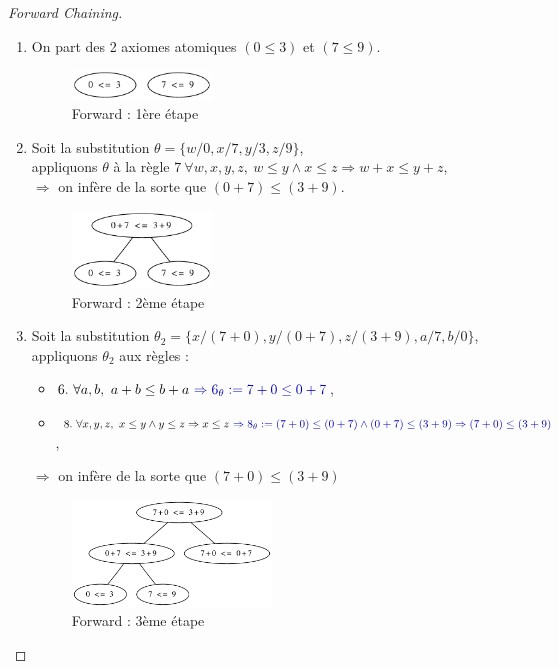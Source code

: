 \documentclass{article}
\newcommand{\blu}[1]{\textcolor{darkblue}{#1}}
\newtheorem{proof}{Preuve}
\begin{document}
\begin{sffamily}
\begin{enumerate}
\begin{proof}[Forward Chaining]$ $\\
\begin{enumerate}[1.]
\item On part des 2 axiomes atomiques $(0\leq 3)$ et $(7\leq 9)$.
\begin{figure}[h!]
    \begin{center}
    \includegraphics[width=0.35\textwidth]{forward1.pdf}
    \caption{Forward : 1ère étape}
    \end{center}	
\end{figure}

\item Soit la substitution $\theta = \{w/0,x/7,y/3,z/9\}$,\\
appliquons $\theta$ à la règle $7\ \forall w, x, y, z,\ w \leq y \wedge x \leq z \Rightarrow w + x \leq y + z$, \\
$\Rightarrow$ on infère de la sorte que $\boxed{(0+7)\leq (3+9)}$.
\begin{figure}[h!]
    \begin{center}
    \includegraphics[width=0.35\textwidth]{forward2.pdf}
    \caption{Forward : 2ème étape}
    \end{center}	
\end{figure}
\newpage
\item Soit la substitution $\theta_2 = \{x/(7+0), y/(0+7), z/(3+9), a/7, b/0\}$,\\
appliquons $\theta_2$ aux règles :
\begin{itemize}
\item $6.\ \forall a, b,\ a + b \leq b + a\ \blu{\Rightarrow 6_\theta := 7+0\leq 0+7}$,
\item $8.\ \forall x, y, z,\ x \leq y \wedge y \leq z \Rightarrow x \leq z\ \blu{\Rightarrow 8_\theta := (7+0) \leq (0+7) \wedge 
(0+7) \leq (3+9) \Rightarrow (7+0) \leq (3+9)}$,
\end{itemize}
$\Rightarrow$ on infère de la sorte que $\boxed{(7+0)\leq (3+9)}$ 
\begin{figure}[h!]
    \begin{center}
    \includegraphics[width=0.5\textwidth]{forward3.pdf}
    \caption{Forward : 3ème étape}
    \end{center}	
\end{figure}


\end{enumerate}
\end{proof}
\end{enumerate}
\end{sffamily}
\end{document}
